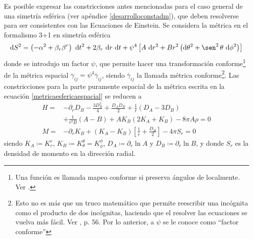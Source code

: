 \documentclass[11pt,twoside,openright,spanish]{report}
\numberwithin{equation}{chapter}
\numberwithin{figure}{chapter}
\numberwithin{table}{chapter}
\renewcommand{\sin}{\operatorname{\sen}}
\begin{document}
Es posible expresar las constricciones antes mencionadas para el caso general de una simetría esférica (ver apéndice \ref{desarrolloconstadm}), que deben resolverse para ser consistentes con las Ecuaciones de Einstein. Se considera la métrica en el formalismo 3+1 en simetría esférica
\begin{equation}
\text{d}S^2=\left(-\alpha^2+\beta_r\beta^r\right)\ \text{d}t^2+2\beta_r\ \text{d}r\ \text{d}t+\psi^4\left[A\ \text{d}r^2+Br^2\left(\text{d}\theta^2+\sin^2\theta\ \text{d}\phi^2\right)\right]
\label{metricaesfericaespacial}
\end{equation}
donde se introdujo un factor $\psi$, que permite hacer una transformación conforme\footnote{Una función es llamada mapeo conforme si preserva ángulos de localmente. Ver \citet{marsdencompleja}.} de la métrica espacial $\gamma_{ij}=\psi^4\overline{\gamma}_{ij}$, siendo $\overline{\gamma}_{ij}$ la llamada métrica conforme\footnote{Esto no es más que un truco matemático que permite reescribir una incógnita como el producto de dos incógnitas, haciendo que el resolver las ecuaciones se vuelva más fácil. Ver \citet{Shapiro2010}, p. 56. Por lo anterior, a $\psi$ se le conoce como ``factor conforme''}. Las constricciones para la parte puramente espacial de la métrica escrita en la ecuación \eqref{metricaesfericaespacial} se reducen a
\begin{align}
\nonumber
H=&-\partial_r D_B-\frac{3D_B^2}{4}+\frac{D_A D_B}{2}+\frac{1}{r}\left(D_A-3D_B\right)\\
&+\frac{1}{r^2B}\left(A-B\right)+AK_B\left(2K_A+K_B\right)-8\pi A\rho=0
\label{consthamiltonianaesferica}\\
M=&-\partial_r K_B+\left(K_A-K_B\right)\left[\frac{1}{r}+\frac{D_B}{2}\right]-4\pi S_r=0
\label{constmomentoesferica}
\end{align}
siendo $K_A\coloneqq K_r^r$, $K_B\coloneqq K_{\theta}^{\theta}=K_{\phi}^\phi$, $D_A\coloneqq\partial_r\ln A$ y  $D_B\coloneqq\partial_r \ln B$, y donde $S_r$ es la densidad de momento en la dirección radial.
\end{document}
